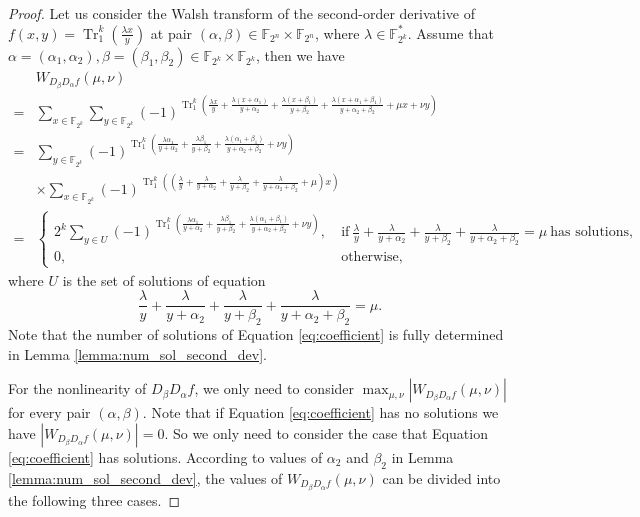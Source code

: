 \documentclass[preprint,10pt]{elsarticle}
\newcommand{\F}{\mathbb{F}}
\newcommand{\0}{\textbf{0}}
\newcommand{\1}{\textbf{1}}
\newcommand{\TRACE}{\operatorname{Tr}_1^k}
\theoremstyle{plain}
\begin{document}
    \begin{proof}
        Let us consider the Walsh transform of the second-order derivative of $f(x,y)=\TRACE\left(\frac{\lambda x}{y}\right)$ at
        pair $(\alpha, \beta)\in\F_{2^n}\times\F_{2^n}$, where $\lambda\in\F_{2^k}^*$.
        Assume that $\alpha=(\alpha_1,\alpha_2),\beta=(\beta_1,\beta_2)\in\F_{2^k}\times\F_{2^k}$, then
        we have
        \begin{align*}\label{eq:secondordersum}
            &W_{D_{\beta}D_{\alpha}f}(\mu,\nu)\nonumber\\
            =&\sum_{x\in\F_{2^k}}\sum_{y\in\F_{2^k}}(-1)^{\TRACE\left(\frac{\lambda x}{y}+\frac{\lambda (x+\alpha_1)}{y+\alpha_2}+\frac{\lambda (x+\beta_1)}{y+\beta_2}+\frac{\lambda (x+\alpha_1+\beta_1)}{y+\alpha_2+\beta_2}+\mu x+\nu y\right)}\nonumber\\
            =&\sum_{y\in\F_{2^k}}(-1)^{\TRACE\left(\frac{\lambda\alpha_1}{y+\alpha_2}+\frac{\lambda\beta_1}{y+\beta_2}+\frac{\lambda(\alpha_1+\beta_1)}{y+\alpha_2+\beta_2}+\nu y\right)}\nonumber\\
            &\times \sum_{x\in\F_{2^k}}(-1)^{\TRACE\left(\left(\frac{\lambda}{y}+\frac{\lambda}{y+\alpha_2}+\frac{\lambda}{y+\beta_2}+\frac{\lambda}{y+\alpha_2+\beta_2}+\mu\right)x\right)}\nonumber\\
            =&\begin{cases}
                2^k\sum_{y\in U}(-1)^{\TRACE\left(\frac{\lambda\alpha_1}{y+\alpha_2}+\frac{\lambda\beta_1}{y+\beta_2}+\frac{\lambda(\alpha_1+\beta_1)}{y+\alpha_2+\beta_2}+\nu y\right)},&~\text{if}~\frac{\lambda}{y}+\frac{\lambda}{y+\alpha_2}+\frac{\lambda}{y+\beta_2}+\frac{\lambda}{y+\alpha_2+\beta_2}=\mu~\text{has solutions},\\
                0, &~\text{otherwise},
            \end{cases}
        \end{align*}
        where $U$ is the set of solutions of equation
        \begin{equation}\label{eq:coefficient}
            \frac{\lambda}{y}+\frac{\lambda}{y+\alpha_2}+\frac{\lambda}{y+\beta_2}+\frac{\lambda}{y+\alpha_2+\beta_2}=\mu.
        \end{equation}
        Note that the number of solutions of Equation \eqref{eq:coefficient} is fully determined in Lemma \ref{lemma:num_sol_second_dev}.

        For the nonlinearity of $D_{\beta}D_{\alpha}f$, we only need to consider $\max_{\mu,\nu}|W_{D_{\beta}D_{\alpha}f}(\mu,\nu)|$ for every pair $(\alpha,\beta)$.
        Note that if Equation \eqref{eq:coefficient} has no solutions we have $\left\lvert W_{D_{\beta}D_{\alpha}f}(\mu,\nu)\right\rvert=0$.
        So we only need to consider the case that Equation \eqref{eq:coefficient} has solutions.
        According to values of $\alpha_2$ and $\beta_2$ in Lemma \ref{lemma:num_sol_second_dev}, the values of $W_{D_{\beta}D_{\alpha}f}(\mu,\nu)$
        can be divided into the following three cases.


\end{proof}
\end{document}
